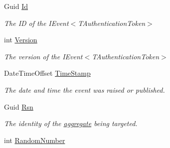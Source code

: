 \begin{DoxyCompactItemize}
Guid \hyperlink{classCqrs_1_1Tests_1_1Integrations_1_1SnapshotTests_1_1RandomNumberEvent_ab2728bed8bd9fd2513468faeff7bc455_ab2728bed8bd9fd2513468faeff7bc455}{Id}
\begin{DoxyCompactList}\small\item\em The ID of the I\+Event$<$\+T\+Authentication\+Token$>$ \end{DoxyCompactList}\item 
int \hyperlink{classCqrs_1_1Tests_1_1Integrations_1_1SnapshotTests_1_1RandomNumberEvent_a291d90456912231da53fea4b7f284102_a291d90456912231da53fea4b7f284102}{Version}
\begin{DoxyCompactList}\small\item\em The version of the I\+Event$<$\+T\+Authentication\+Token$>$ \end{DoxyCompactList}\item 
Date\+Time\+Offset \hyperlink{classCqrs_1_1Tests_1_1Integrations_1_1SnapshotTests_1_1RandomNumberEvent_a654cc635e897425d9e1a06e542cfa52b_a654cc635e897425d9e1a06e542cfa52b}{Time\+Stamp}
\begin{DoxyCompactList}\small\item\em The date and time the event was raised or published. \end{DoxyCompactList}\item 
Guid \hyperlink{classCqrs_1_1Tests_1_1Integrations_1_1SnapshotTests_1_1RandomNumberEvent_a4717920e558ee88fbeb0a6975ae39c54_a4717920e558ee88fbeb0a6975ae39c54}{Rsn}
\begin{DoxyCompactList}\small\item\em The identity of the \hyperlink{}{aggregate} being targeted. \end{DoxyCompactList}\item 
int \hyperlink{classCqrs_1_1Tests_1_1Integrations_1_1SnapshotTests_1_1RandomNumberEvent_a16f55c2fdc783a4cc27f5f875801a93f_a16f55c2fdc783a4cc27f5f875801a93f}{Random\+Number}
\end{DoxyCompactItemize}



